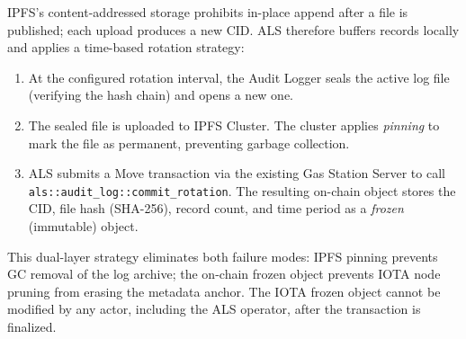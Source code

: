 IPFS's content-addressed storage prohibits in-place append after a file is
published; each upload produces a new CID. ALS therefore buffers records
locally and applies a time-based rotation strategy:

\begin{enumerate}
    \item At the configured rotation interval, the Audit Logger seals the
    active log file (verifying the hash chain) and opens a new one.

    \item The sealed file is uploaded to IPFS Cluster. The cluster applies
    \emph{pinning} to mark the file as permanent, preventing garbage
    collection.

    \item ALS submits a Move transaction via the existing Gas Station Server
    to call \texttt{als::audit\_log::commit\_rotation}. The resulting on-chain
    object stores the CID, file hash (SHA-256), record count, and time period
    as a \emph{frozen} (immutable) object.
\end{enumerate}

This dual-layer strategy eliminates both failure modes: IPFS pinning prevents
GC removal of the log archive; the on-chain frozen object prevents IOTA node
pruning from erasing the metadata anchor. The IOTA frozen object cannot be
modified by any actor, including the ALS operator, after the transaction is
finalized.